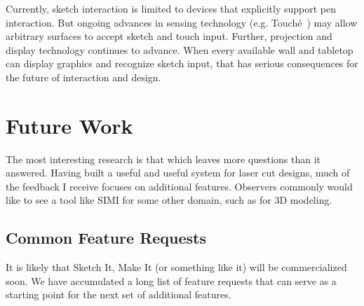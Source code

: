 Currently, sketch interaction is limited to devices that explicitly
support pen interaction. But ongoing advances in sensing technology
(e.g. Touch\'e~\cite{sato-touche}) may allow arbitrary surfaces to
accept sketch and touch input. Further, projection and display
technology continues to advance. When every available wall and
tabletop can display graphics and recognize sketch input, that has
serious consequences for the future of interaction and design.




\section{Future Work}

The most interesting research is that which leaves more questions than
it answered. Having built a useful and useful system for laser cut
designs, much of the feedback I receive focuses on additional
features. Observers commonly would like to see a tool like SIMI for
some other domain, such as for 3D modeling.

\subsection{Common Feature Requests}

It is likely that Sketch It, Make It (or something like it) will be
commercialized soon. We have accumulated a long list of feature
requests that can serve as a starting point for the next set of
additional features. 

